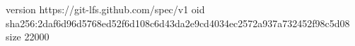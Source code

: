 version https://git-lfs.github.com/spec/v1
oid sha256:2daf6d96d5768ed52f6d108c6d43da2e9cd4034ec2572a937a732452f98c5d08
size 22000
